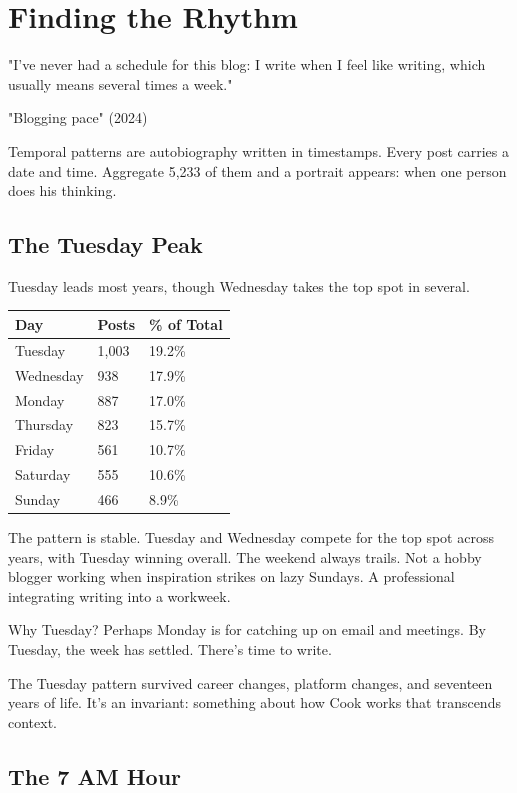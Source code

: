 \chapter{Finding the Rhythm}

\nopagebreak
\epigraph{"I've never had a schedule for this blog: I write when I feel like writing, which usually means several times a week."}{"Blogging pace" (2024)}
\nopagebreak

Temporal patterns are autobiography written in timestamps. Every post carries a date and time. Aggregate 5,233 of them and a portrait appears: when one person does his thinking.

\bigskip

\section*{The Tuesday Peak}

Tuesday leads most years, though Wednesday takes the top spot in several.

\begin{longtable}{p{3.00cm}p{3.00cm}p{3.00cm}}
\toprule
\textbf{Day} & \textbf{Posts} & \textbf{\% of Total} \tabularnewline
\midrule
Tuesday & 1,003 & 19.2\% \tabularnewline
Wednesday & 938 & 17.9\% \tabularnewline
Monday & 887 & 17.0\% \tabularnewline
Thursday & 823 & 15.7\% \tabularnewline
Friday & 561 & 10.7\% \tabularnewline
Saturday & 555 & 10.6\% \tabularnewline
Sunday & 466 & 8.9\% \tabularnewline
\bottomrule
\end{longtable}

The pattern is stable. Tuesday and Wednesday compete for the top spot across years, with Tuesday winning overall. The weekend always trails. Not a hobby blogger working when inspiration strikes on lazy Sundays. A professional integrating writing into a workweek.

Why Tuesday? Perhaps Monday is for catching up on email and meetings. By Tuesday, the week has settled. There's time to write.

The Tuesday pattern survived career changes, platform changes, and seventeen years of life. It's an invariant: something about how Cook works that transcends context.


\bigskip

\section*{The 7 AM Hour}

